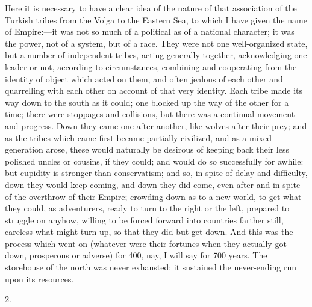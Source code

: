 Here it is necessary to have a
clear idea of the nature of that association of the Turkish tribes
from the Volga to the Eastern Sea, to which I have given the name of
Empire:—it was not so much of a political as of a national
character; it was the power, not of a system, but of a race. They were
not one well-organized state, but a number of independent tribes,
acting generally together, acknowledging one leader or not, according
to circumstances, combining and cooperating from the identity of
object which acted on them, and often jealous of each other and
quarrelling with each other on account of that very identity. Each
tribe made its way down to the south as it could; one blocked up the
way of the other for a time; there were stoppages and collisions, but
there was a continual movement and progress. Down they came one after
another, like wolves after their prey; and as the tribes which came
first became partially civilized, and as a mixed generation arose,
these would naturally be desirous of keeping back their less
polished uncles or cousins, if they could; and would do so
successfully for awhile: but cupidity is stronger than conservatism;
and so, in spite of delay and difficulty, down they would keep coming,
and down they did come, even after and in spite of the overthrow of
their Empire; crowding down as to a new world, to get what they could,
as adventurers, ready to turn to the right or the left, prepared to
struggle on anyhow, willing to be forced forward into countries
farther still, careless what might turn up, so that they did but get
down. And this was the process which went on (whatever were their
fortunes when they actually got down, prosperous or adverse) for 400,
nay, I will say for 700 years. The storehouse of the north was never
exhausted; it sustained the never-ending run upon its resources.

2.


